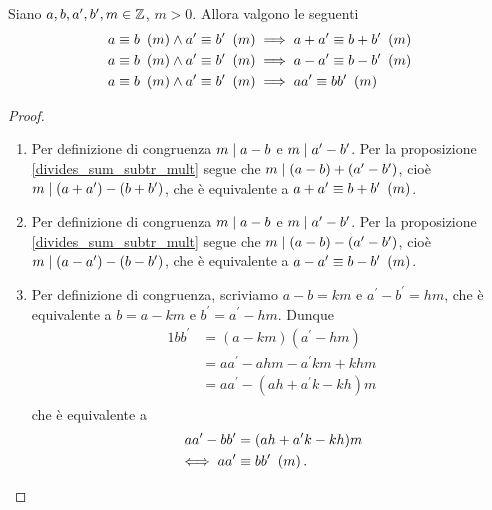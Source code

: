 \begin{proposition}
    Siano $a, b, a^\prime, b^\prime, m \in \mathbb{Z}$, $m > 0$. Allora valgono le seguenti
    \begin{align}
        &a \equiv b \ \left(m\right)\land a^\prime \equiv b^\prime \ \left(m\right)\implies a+a^\prime \equiv b+b^\prime\ \left(m\right) \label{somma_congrui}\\
        &a \equiv b \ \left(m\right)\land a^\prime \equiv b^\prime \ \left(m\right)\implies a-a^\prime \equiv b-b^\prime\ \left(m\right) \label{differenza_congrui}\\
        &a \equiv b \ \left(m\right)\land a^\prime \equiv b^\prime \ \left(m\right)\implies aa^\prime \equiv bb^\prime\ \left(m\right) \label{prodotto_congrui}
    \end{align}
\end{proposition}
\begin{proof}
    \begin{enumerate}
        \item Per definizione di congruenza $m \mid a - b$ e $m \mid a^\prime - b^\prime$. Per la proposizione \ref{divides_sum_subtr_mult} segue che $m \mid (a - b) + (a^\prime - b^\prime)$, cioè $m \mid (a + a^\prime) - (b + b^\prime)$, che è equivalente a $a+a^\prime \equiv b+b^\prime\ \left(m\right)$.
        \item Per definizione di congruenza $m \mid a - b$ e $m \mid a^\prime - b^\prime$. Per la proposizione \ref{divides_sum_subtr_mult} segue che $m \mid (a - b) - (a^\prime - b^\prime)$, cioè $m \mid (a - a^\prime) - (b - b^\prime)$, che è equivalente a $a-a^\prime \equiv b-b^\prime\ \left(m\right)$.
        \item Per definizione di congruenza, scriviamo $a - b = km$ e $a^\prime - b^\prime = hm$, che è equivalente a $b = a - km$ e $b^\prime = a^\prime - hm$. Dunque
        \begin{alignat*}
            {1}
            bb^\prime &= (a - km)(a^\prime - hm) \\
                &= aa^\prime - ahm - a^\prime km + khm \\
                &= aa^\prime - (ah + a^\prime k - kh)m \\
        \end{alignat*}    
        che è equivalente a
        \begin{alignat*} {1}
            aa^\prime - bb^\prime &= (ah + a^\prime k - kh)m \\
            \iff aa^\prime &\equiv bb^\prime \ \left(m\right).
        \end{alignat*} \qedhere
    \end{enumerate}
\end{proof}

